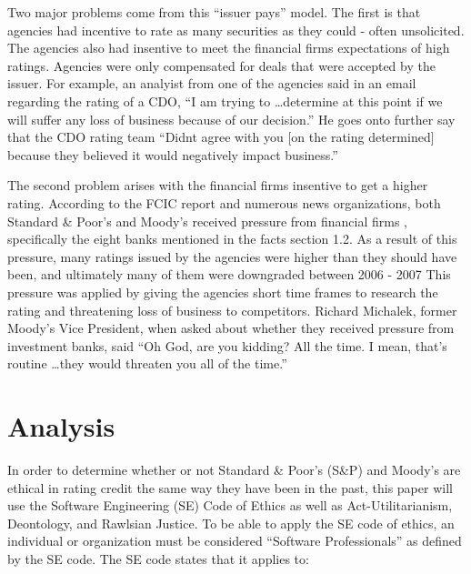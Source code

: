 \documentclass[11pt]{article}
\begin{document}
\begin{multicols}{2}
Two major problems come from this ``issuer pays'' model.  The first is that agencies had incentive to rate as many securities as they could - often unsolicited. \cite[p.60]{gatekeepers} The agencies also had insentive to meet the financial firms expectations of high ratings.  Agencies were only compensated for deals that were accepted by the issuer. \cite[p.210]{govtReport} For example, an analyist from one of the agencies said in an email regarding the rating of a CDO, ``I am trying to \ldots determine at this point if we will suffer any loss of business because of our decision.'' He goes onto further say that the CDO rating team ``Didnt agree with you [on the rating determined] because they believed it would negatively impact business.'' \cite[p. 26]{SEA} 

The second problem arises with the financial firms insentive to get a higher rating.  According to the FCIC report and numerous news organizations, both Standard \& Poor's and Moody's received pressure from financial firms \cite[p.xxv]{govtReport}, specifically the eight banks mentioned in the facts section 1.2.  As a result of this pressure, many ratings issued by the agencies were higher than they should have been, and ultimately many of them were downgraded between 2006 - 2007 \cite{ratingEthics, huffCreditCause}  This pressure was applied by giving the agencies short time frames to research the rating and threatening loss of business to competitors. \cite[p.210]{govtReport}  Richard Michalek, former Moody's Vice President, when asked about whether they received pressure from investment banks, said ``Oh God, are you kidding? All the time. I mean, that's routine \ldots they would threaten you all of the time.'' \cite[p.210]{govtReport}



\section{Analysis}
In order to determine whether or not Standard \& Poor's (S\&P) and Moody's are ethical in rating credit the same way they have been in the past, this paper will use the Software Engineering (SE) Code of Ethics as well as Act-Utilitarianism, Deontology, and Rawlsian Justice.  To be able to apply the SE code of ethics, an individual or organization must be considered ``Software Professionals'' as defined by the SE code. The SE code states that it applies to:


\end{multicols}
\end{document}
